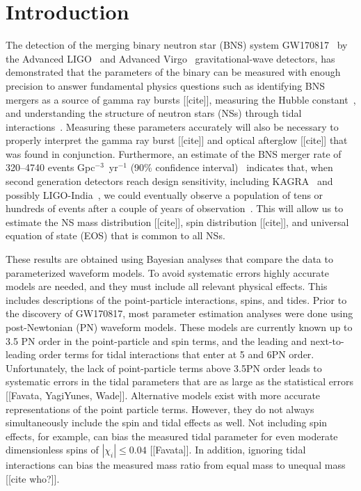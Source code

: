\documentclass[prd,aps,letter,twocolumn,floatfix,notitlepage,nofootinbib]{revtex4-1}
\begin{document}
\section{Introduction}

The detection of the merging binary neutron star (BNS) system GW170817~\cite{GW170817} by the Advanced LIGO~\cite{Harry2010} and Advanced Virgo~\cite{Acernese2009} gravitational-wave detectors, has demonstrated that the parameters of the binary can be measured with enough precision to answer fundamental physics questions such as identifying BNS mergers as a source of gamma ray bursts [[cite]], measuring the Hubble constant~\cite{GW170817Hubble}, and understanding the structure of neutron stars (NSs) through tidal interactions~\cite{GW170817}. Measuring these parameters accurately will also be necessary to properly interpret the gamma ray burst [[cite]] and optical afterglow [[cite]] that was found in conjunction. Furthermore, an estimate of the BNS merger rate of 320--4740 events Gpc$^{-3}$~yr$^{-1}$ (90\% confidence interval)~\cite{GW170817} indicates that, when second generation detectors reach design sensitivity, including KAGRA~\cite{Somiya2012} and possibly LIGO-India~\cite{IyerSouradeepUnnikrishnan2011}, we could eventually observe a population of tens or hundreds of events after a couple of years of observation~\cite{LIGORate2010}. This will allow us to estimate the NS mass distribution [[cite]], spin distribution [[cite]], and universal equation of state (EOS) that is common to all NSs\cite{DelPozzoLiAgathos2013, LackeyWade2015}. 

These results are obtained using Bayesian analyses that compare the data to parameterized waveform models. To avoid systematic errors highly accurate models are needed, and they must include all relevant physical effects. This includes descriptions of the point-particle interactions, spins, and tides. Prior to the discovery of GW170817, most parameter estimation analyses were done using post-Newtonian (PN) waveform models. These models are currently known up to 3.5 PN order in the point-particle and spin terms, and the leading and next-to-leading order terms for tidal interactions that enter at 5 and 6PN order. Unfortunately, the lack of point-particle terms above 3.5PN order leads to systematic errors in the tidal parameters that are as large as the statistical errors [[Favata, YagiYunes, Wade]]. Alternative models exist with more accurate representations of the point particle terms. However, they do not always simultaneously include the spin and tidal effects as well. Not including spin effects, for example, can bias the measured tidal parameter for even moderate dimensionless spins of $|\chi_i| \le 0.04$ [[Favata]]. In addition, ignoring tidal interactions can bias the measured mass ratio from equal mass to unequal mass [[cite who?]].
\end{document}
